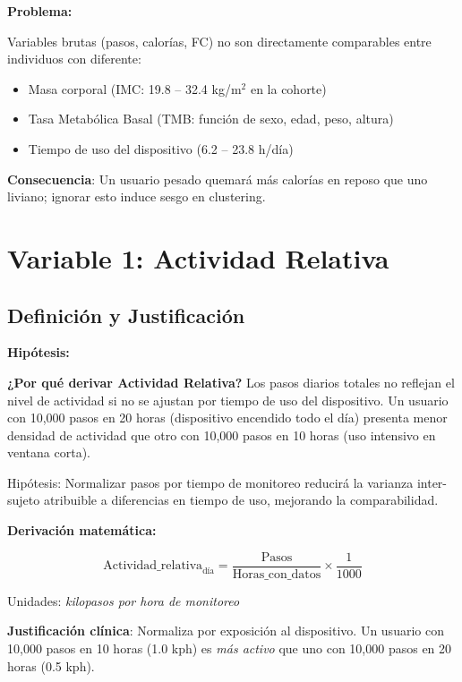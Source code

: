 \documentclass[12pt,letterpaper,twoside]{report}
\begin{document}
\begin{hipotesisbox}
\textbf{Problema:}

Variables brutas (pasos, calorías, FC) no son directamente comparables entre individuos con diferente:
\begin{itemize}[noitemsep]
    \item Masa corporal (IMC: 19.8 -- 32.4 kg/m$^2$ en la cohorte)
    \item Tasa Metabólica Basal (TMB: función de sexo, edad, peso, altura)
    \item Tiempo de uso del dispositivo (6.2 -- 23.8 h/día)
\end{itemize}

\textbf{Consecuencia}: Un usuario pesado quemará más calorías en reposo que uno liviano; ignorar esto induce sesgo en clustering.
\end{hipotesisbox}

\section{Variable 1: Actividad Relativa}

\subsection{Definición y Justificación}

\begin{hipotesisbox}
\textbf{Hipótesis:}

\textbf{¿Por qué derivar Actividad Relativa?} Los pasos diarios totales no reflejan el nivel de actividad si no se ajustan por tiempo de uso del dispositivo. Un usuario con 10,000 pasos en 20 horas (dispositivo encendido todo el día) presenta menor densidad de actividad que otro con 10,000 pasos en 10 horas (uso intensivo en ventana corta).

Hipótesis: Normalizar pasos por tiempo de monitoreo reducirá la varianza inter-sujeto atribuible a diferencias en tiempo de uso, mejorando la comparabilidad.
\end{hipotesisbox}

\begin{estadisticobox}
\textbf{Derivación matemática:}

\begin{equation}
\text{Actividad\_relativa}_{\text{día}} = \frac{\text{Pasos}}{\text{Horas\_con\_datos}} \times \frac{1}{1000}
\end{equation}

Unidades: \textit{kilopasos por hora de monitoreo}

\textbf{Justificación clínica}: Normaliza por exposición al dispositivo. Un usuario con 10,000 pasos en 10 horas (1.0 kph) es \textit{más activo} que uno con 10,000 pasos en 20 horas (0.5 kph).
\end{estadisticobox}
\end{document}
